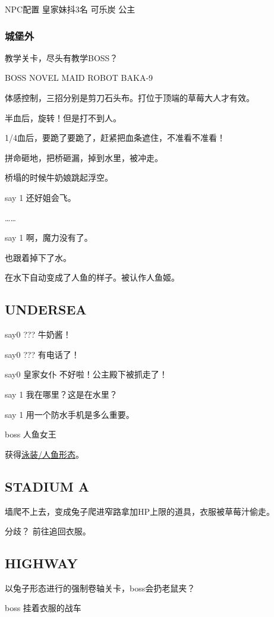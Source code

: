 \documentclass{article}
\begin{document}
NPC配置 皇家妹抖3名 可乐炭 公主

\subsubsection{城堡外}

教学关卡，尽头有教学BOSS？

BOSS NOVEL MAID ROBOT BAKA-9

体感控制，三招分别是剪刀石头布。打位于顶端的草莓大人才有效。

半血后，旋转！但是打不到人。

1/4血后，要跪了要跪了，赶紧把血条遮住，不准看不准看！

拼命砸地，把桥砸漏，掉到水里，被冲走。

桥塌的时候牛奶娘跳起浮空。

say 1 还好姐会飞。

……

say 1 啊，魔力没有了。

也跟着掉下了水。

在水下自动变成了人鱼的样子。被认作人鱼姬。

\subsection{UNDERSEA}

say0 ??? 牛奶酱！

say0 ??? 有电话了！

say0 皇家女仆 不好啦！公主殿下被抓走了！

say 1 我在哪里？这是在水里？

say 1 用一个防水手机是多么重要。

boss 人鱼女王

获得\hyperref[costume_mermaid]{泳装/人鱼形态}。

\subsection{STADIUM A}

墙爬不上去，变成兔子爬进窄路拿加HP上限的道具，衣服被草莓汁偷走。

分歧？ 前往追回衣服。

\subsection{HIGHWAY}

以兔子形态进行的强制卷轴关卡，boss会扔老鼠夹？

boss 挂着衣服的战车
\end{document}
